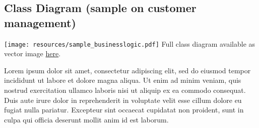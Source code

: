 \subsection{Class Diagram (sample on customer management)}


\texttt{[image: resources/sample\_businesslogic.pdf]}
Full class diagram available as vector image \href{https://drive.google.com/file/d/1cTR0OGGH9rbpp6zuY7K3tNlbGnMKxU8j/view?usp=share_link}{here}.

\pagebreak

 
Lorem ipsum dolor sit amet, consectetur adipiscing elit, sed do eiusmod tempor incididunt ut labore et dolore magna aliqua. Ut enim ad minim veniam, quis nostrud exercitation ullamco laboris nisi ut aliquip ex ea commodo consequat. Duis aute irure dolor in reprehenderit in voluptate velit esse cillum dolore eu fugiat nulla pariatur. Excepteur sint occaecat cupidatat non proident, sunt in culpa qui officia deserunt mollit anim id est laborum.